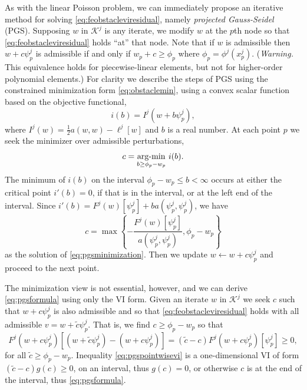 \documentclass[letterpaper,final,12pt,reqno]{amsart}
\theoremstyle{claim}
\numberwithin{equation}{section}
\numberwithin{figure}{section}
\numberwithin{table}{section}
\numberwithin{theorem}{section}
\begin{document}
As with the linear Poisson problem, we can immediately propose an iterative method for solving \eqref{eq:feobstacleviresidual}, namely \emph{projected Gauss-Seidel} (PGS).  Supposing $w$ in $\mathcal{K}^j$ is any iterate, we modify $w$ at the $p$th node so that \eqref{eq:feobstacleviresidual} holds ``at'' that node.  Note that if $w$ is admissible then $w+c\psi_p^j$ is admissible if and only if $w_p + c \ge \phi_p$ where $\phi_p = \phi^j(x_p^j)$.  (\emph{Warning.}  This equivalence holds for piecewise-linear elements, but not for higher-order polynomial elements.)  For clarity we describe the steps of PGS using the constrained minimization form \eqref{eq:obstaclemin}, using a convex scalar function based on the objective functional,
\begin{equation}
i(b) = I^j(w+b\psi_p^j),
\end{equation}
where $I^j(w) = \frac{1}{2} a(w,w) - \ell^j[w]$ and $b$ is a real number.  At each point $p$ we seek the minimizer over admissible perturbations,
\begin{equation}
  c = \mathop{\mathrm{arg\text{-}min}}_{b \ge \phi_p - w_p} \, i(b).  \label{eq:pgsminimization}
\end{equation}
The minimum of $i(b)$ on the interval $\phi_p - w_p \le b < \infty$ occurs at either the critical point $i'(b)=0$, if that is in the interval, or at the left end of the interval.  Since $i'(b) = F^j(w)[\psi_p^j] + b a(\psi_p^j,\psi_p^j)$, we have
\begin{equation}
  c = \max\left\{-\frac{F^j(w)[\psi_p^j]}{a(\psi_p^j,\psi_p^j)}, \phi_p - w_p\right\}  \label{eq:pgsformula}
\end{equation}
as the solution of \eqref{eq:pgsminimization}.  Then we update $w \gets w + c\psi_p^j$ and proceed to the next point.

The minimization view is not essential, however, and we can derive \eqref{eq:pgsformula} using only the VI form.  Given an iterate $w$ in $\mathcal{K}^j$ we seek $c$ such that $w+c\psi_p^j$ is also admissible and so that \eqref{eq:feobstacleviresidual} holds with all admissible $v=w+\tilde c\psi_p^j$.  That is, we find $c\ge \phi_p-w_p$ so that
\begin{equation}
  F^j(w+c\psi_p^j)[(w+\tilde c\psi_p^j) - (w+c\psi_p^j)] = (\tilde c - c) F^j(w+c\psi_p^j)[\psi_p^j] \ge 0,  \label{eq:pgspointwisevi}
\end{equation}
for all $\tilde c\ge \phi_p-w_p$.  Inequality \eqref{eq:pgspointwisevi} is a one-dimensional VI of form $(\tilde c - c)g(c) \ge 0$, on an interval, thus $g(c)=0$, or otherwise $c$ is at the end of the interval, thus \eqref{eq:pgsformula}.
\end{document}
